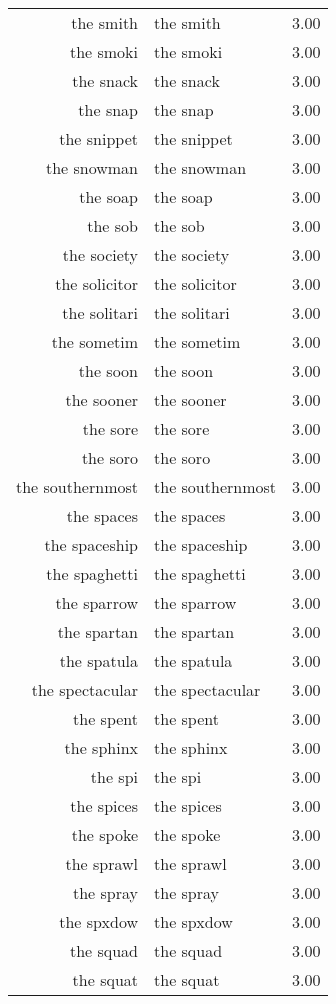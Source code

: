 \begin{table}[ht]
\begin{tabular}{rlr}
  the smith & the smith & 3.00 \\ 
  the smoki & the smoki & 3.00 \\ 
  the snack & the snack & 3.00 \\ 
  the snap & the snap & 3.00 \\ 
  the snippet & the snippet & 3.00 \\ 
  the snowman & the snowman & 3.00 \\ 
  the soap & the soap & 3.00 \\ 
  the sob & the sob & 3.00 \\ 
  the society & the society & 3.00 \\ 
  the solicitor & the solicitor & 3.00 \\ 
  the solitari & the solitari & 3.00 \\ 
  the sometim & the sometim & 3.00 \\ 
  the soon & the soon & 3.00 \\ 
  the sooner & the sooner & 3.00 \\ 
  the sore & the sore & 3.00 \\ 
  the soro & the soro & 3.00 \\ 
  the southernmost & the southernmost & 3.00 \\ 
  the spaces & the spaces & 3.00 \\ 
  the spaceship & the spaceship & 3.00 \\ 
  the spaghetti & the spaghetti & 3.00 \\ 
  the sparrow & the sparrow & 3.00 \\ 
  the spartan & the spartan & 3.00 \\ 
  the spatula & the spatula & 3.00 \\ 
  the spectacular & the spectacular & 3.00 \\ 
  the spent & the spent & 3.00 \\ 
  the sphinx & the sphinx & 3.00 \\ 
  the spi & the spi & 3.00 \\ 
  the spices & the spices & 3.00 \\ 
  the spoke & the spoke & 3.00 \\ 
  the sprawl & the sprawl & 3.00 \\ 
  the spray & the spray & 3.00 \\ 
  the spxdow & the spxdow & 3.00 \\ 
  the squad & the squad & 3.00 \\ 
  the squat & the squat & 3.00 \\ 

\end{tabular}
\end{table}
